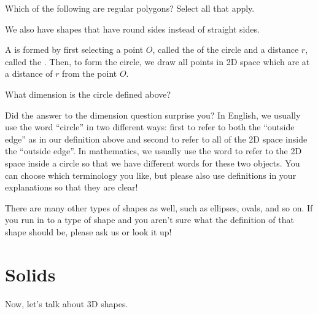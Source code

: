 \documentclass{ximera}
\begin{document}
\begin{question}
Which of the following are regular polygons? Select all that apply.
\begin{selectAll}
\end{selectAll}
\end{question}

We also have shapes that have round sides instead of straight sides.
\begin{definition}
A  is formed by first selecting a point $O$, called the  of the circle and a distance $r$, called the . Then, to form the circle, we draw all points in 2D space which are at a distance of $r$ from the point $O$.
\end{definition}

\begin{question}
	What dimension is the circle defined above?
	\begin{prompt}
		\begin{multipleChoice}
		\end{multipleChoice}
	\end{prompt}
\end{question}
Did the answer to the dimension question surprise you? In English, we usually use the word ``circle'' in two different ways: first to refer to both the ``outside edge'' as in our definition above and second to refer to all of the 2D space inside the ``outside edge''. In mathematics, we usually use the word  to refer to the 2D space inside a circle so that we have different words for these two objects. You can choose which terminology you like, but please also use definitions in your explanations so that they are clear!

There are many other types of shapes as well, such as ellipses, ovals, and so on. If you run in to a type of shape and you aren't sure what the definition of that shape should be, please ask us or look it up!


\section{Solids}

Now, let's talk about 3D shapes.
\end{document}
